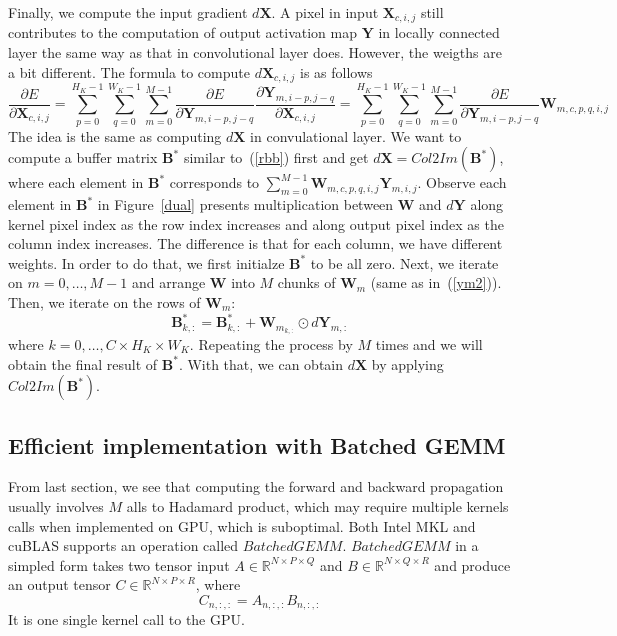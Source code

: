 \documentclass[authordraft=true,dvipsnames]{acmart}
\newcommand{\pref}[1]{(\ref{#1})}
\newcommand{\bx}[0]{\mathbf{X}}
\newcommand{\bw}[0]{\mathbf{W}}
\newcommand{\by}[0]{\mathbf{Y}}
\newcommand{\bb}[0]{\mathbf{B}}
\begin{document}
Finally, we compute the input gradient $d\bx$. A pixel in input $\bx_{c,i,j}$ still contributes to the computation of output activation map $\by$ in locally connected layer the same way as that in convolutional layer does. However, the weigths are a bit different. The formula to compute $d\bx_{c,i,j}$ is as follows
\begin{equation}
\frac{\partial E}{\partial \bx_{c,i,j}} = \sum_{p=0}^{H_K-1}{\sum_{q=0}^{W_K-1}{\sum_{m=0}^{M-1}{\frac{\partial E}{\partial \by_{m,i-p,j-q}}\frac{\partial \mathbf{Y}_{m,i-p,j-q}}{\partial \mathbf{X}_{c,i,j}}}}} = \sum_{p=0}^{H_K-1}{\sum_{q=0}^{W_K-1}{\sum_{m=0}^{M-1}{\frac{\partial E}{\partial \by_{m,i-p,j-q}} \bw_{m,c,p,q,i,j}}}} 
\end{equation}
The idea is the same as computing $d\bx$ in convulational layer. We want to compute a buffer matrix $\bb^*$ similar to~\pref{rbb} first and get $d\bx = Col2Im(\mathbf{B}^*)$, where each element in $\mathbf{B}^*$ corresponds to $\sum_{m=0}^{M-1}{\bw_{m,c,p,q,i,j}\by_{m,i,j}}$. Observe each element in $\bb^*$ in Figure~\ref{dual} presents multiplication between $\bw$ and $d\by$ along kernel pixel index as the row index increases and along output pixel index as the column index increases. The difference is that for each column, we have different weights. In order to do that, we first initialze $\mathbf{B}^*$ to be all zero.  
Next, we iterate on $m=0,\ldots,M-1$ and arrange $\bw$ into $M$ chunks of $\bw_m$ (same as in~\pref{ym2}). Then, we iterate on the rows of $\bw_m$:
\begin{equation*}
\bb^*_{k,:} = \bb^*_{k,:} + \bw_{m_{k,:}} \odot d\by_{m,:}
\end{equation*}
where $k=0,\ldots, C \times H_K \times W_K$. Repeating the process by $M$ times and we will obtain the final result of $\bb^*$. With that, we can obtain $d\bx$ by applying $Col2Im(\bb^*)$. 

\subsection{Efficient implementation with Batched GEMM}
From last section, we see that computing the forward and backward propagation usually involves $M$ alls to Hadamard product, which may require multiple kernels calls when implemented on GPU, which is suboptimal. Both Intel MKL and cuBLAS supports an operation called $BatchedGEMM$. $BatchedGEMM$ in a simpled form takes two tensor input $A \in \mathbb{R} ^{N \times P \times Q}$ and $B \in \mathbb{R}^{N \times Q \times R}$ and produce an output tensor $C \in \mathbb{R}^{N \times P \times R}$, where
\begin{equation*}
C_{n, :, :} = A_{n, :, :} B_{n, :, :}
\end{equation*}
It is one single kernel call to the GPU. 
\end{document}
